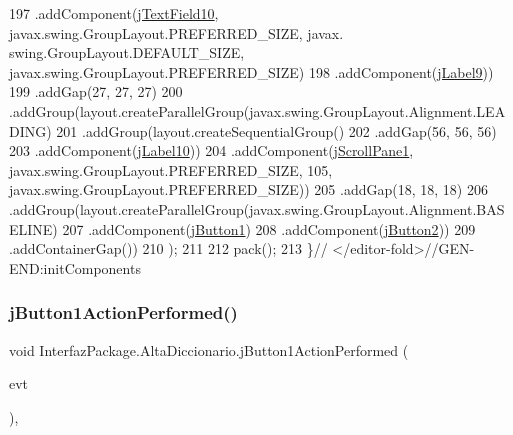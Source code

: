 \begin{DoxyCode}
197                     .addComponent(\mbox{\hyperlink{class_interfaz_package_1_1_alta_diccionario_a4fb32d82093d4c678abb7a5130e2cf23}{jTextField10}}, javax.swing.GroupLayout.PREFERRED\_SIZE, javax.
      swing.GroupLayout.DEFAULT\_SIZE, javax.swing.GroupLayout.PREFERRED\_SIZE)
198                     .addComponent(\mbox{\hyperlink{class_interfaz_package_1_1_alta_diccionario_a1292835cd1c494573c6e62a250c99f55}{jLabel9}}))
199                 .addGap(27, 27, 27)
200                 .addGroup(layout.createParallelGroup(javax.swing.GroupLayout.Alignment.LEADING)
201                     .addGroup(layout.createSequentialGroup()
202                         .addGap(56, 56, 56)
203                         .addComponent(\mbox{\hyperlink{class_interfaz_package_1_1_alta_diccionario_a49c268b57b92d0d57a86f0350e887083}{jLabel10}}))
204                     .addComponent(\mbox{\hyperlink{class_interfaz_package_1_1_alta_diccionario_a0b33f28ce4ff536b4ef1fa9b546c8ae4}{jScrollPane1}}, javax.swing.GroupLayout.PREFERRED\_SIZE, 105, 
      javax.swing.GroupLayout.PREFERRED\_SIZE))
205                 .addGap(18, 18, 18)
206                 .addGroup(layout.createParallelGroup(javax.swing.GroupLayout.Alignment.BASELINE)
207                     .addComponent(\mbox{\hyperlink{class_interfaz_package_1_1_alta_diccionario_a0f3026ebbc0c7a84616c54c8279221e6}{jButton1}})
208                     .addComponent(\mbox{\hyperlink{class_interfaz_package_1_1_alta_diccionario_a521eb08d96dea01d2c690fcbf9804e57}{jButton2}}))
209                 .addContainerGap())
210         );
211 
212         pack();
213     \}\textcolor{comment}{// </editor-fold>//GEN-END:initComponents}
\end{DoxyCode}
\mbox{\label{class_interfaz_package_1_1_alta_diccionario_a07a3a587fdc3ee1428939151ae5963c0}} 
\subsubsection{\texorpdfstring{j\+Button1\+Action\+Performed()}{jButton1ActionPerformed()}}
{\footnotesize\ttfamily void Interfaz\+Package.\+Alta\+Diccionario.\+j\+Button1\+Action\+Performed (\begin{DoxyParamCaption}\item[{java.\+awt.\+event.\+Action\+Event}]{evt }\end{DoxyParamCaption})\hspace{0.3cm}{\ttfamily [inline]}, {\ttfamily [private]}}



